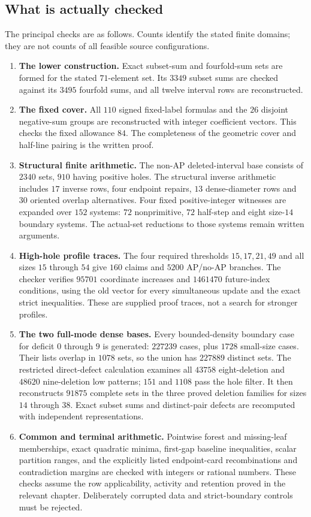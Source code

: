 \documentclass[11pt,letterpaper]{article}
\theoremstyle{definition}\newtheorem{definition}[theorem]{Definition}
\begin{document}
\subsection{What is actually checked}
The principal checks are as follows. Counts identify the stated finite domains; they are not counts of all feasible source configurations.
\begin{enumerate}
\item \textbf{The lower construction.} Exact subset-sum and fourfold-sum sets are formed for the stated $71$-element set. Its $3349$ subset sums are checked against its $3495$ fourfold sums, and all twelve interval rows are reconstructed.
\item \textbf{The fixed cover.} All $110$ signed fixed-label formulas and the $26$ disjoint negative-sum groups are reconstructed with integer coefficient vectors. This checks the fixed allowance $84$. The completeness of the geometric cover and half-line pairing is the written proof.
\item \textbf{Structural finite arithmetic.} The non-AP deleted-interval base consists of $2340$ sets, $910$ having positive holes. The structural inverse arithmetic includes $17$ inverse rows, four endpoint repairs, $13$ dense-diameter rows and $30$ oriented overlap alternatives. Four fixed positive-integer witnesses are expanded over $152$ systems: $72$ nonprimitive, $72$ half-step and eight size-$14$ boundary systems. The actual-set reductions to those systems remain written arguments.
\item \textbf{High-hole profile traces.} The four required thresholds $15,17,21,49$ and all sizes $15$ through $54$ give $160$ claims and $5200$ AP/no-AP branches. The checker verifies $95701$ coordinate increases and $1461470$ future-index conditions, using the old vector for every simultaneous update and the exact strict inequalities. These are supplied proof traces, not a search for stronger profiles.
\item \textbf{The two full-mode dense bases.} Every bounded-density boundary case for deficit $0$ through $9$ is generated: $227239$ cases, plus $1728$ small-size cases. Their lists overlap in $1078$ sets, so the union has $227889$ distinct sets. The restricted direct-defect calculation examines all $43758$ eight-deletion and $48620$ nine-deletion low patterns; $151$ and $1108$ pass the hole filter. It then reconstructs $91875$ complete sets in the three proved deletion families for sizes $14$ through $38$. Exact subset sums and distinct-pair defects are recomputed with independent representations.
\item \textbf{Common and terminal arithmetic.} Pointwise forest and missing-leaf memberships, exact quadratic minima, first-gap baseline inequalities, scalar partition ranges, and the explicitly listed endpoint-card recombinations and contradiction margins are checked with integers or rational numbers. These checks assume the row applicability, activity and retention proved in the relevant chapter. Deliberately corrupted data and strict-boundary controls must be rejected.
\end{enumerate}
\end{document}
